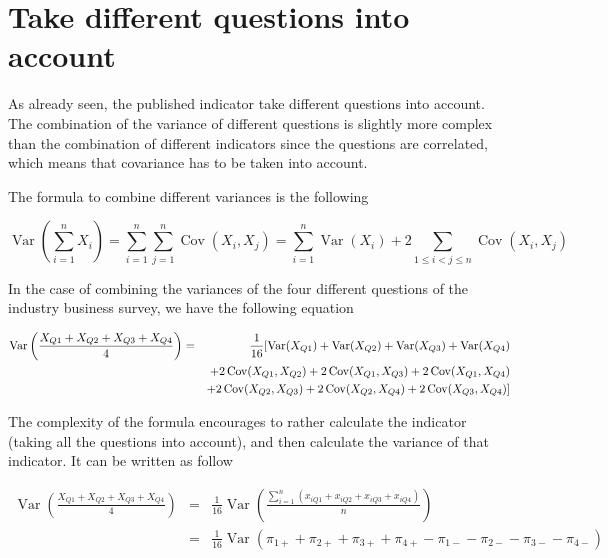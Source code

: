 \documentclass[12pt,a4paper,oneside]{book}
\DeclareMathOperator{\Var}{Var}
\DeclareMathOperator{\Cov}{Cov}
\begin{document}
\section{Take different questions into account}

As already seen, the published indicator take different questions into account. 
The combination of the variance of different questions is slightly more complex than the combination of different indicators since the questions are correlated, which means that covariance has to be taken into account.

The formula to combine different variances is the following

\begin{equation}
\Var \left(\sum_{i=1}^{n} X_{i}\right) = \sum_{i=1}^{n} \sum_{j=1}^{n} \Cov\left(X_{i}, X_{j}\right)
= \sum_{i=1}^{n} \Var\left(X_{i}\right)+2 \sum_{1 \leq i<j \leq n} \Cov\left(X_{i}, X_{j}\right)
\end{equation} 

In the case of combining the variances of the four different questions of the industry business survey, we have the following equation

\begin{eqnarray}
    \Var \left(\frac{X_{Q1} + X_{Q2} + X_{Q3} + X_{Q4}}{4} \right) &=& \frac{1}{16} \large[ \Var(X_{Q1}) + \Var(X_{Q2}) + \Var(X_{Q3}) + \Var(X_{Q4}) \nonumber \\
    && + 2 \Cov (X_{Q1},X_{Q2}) + 2 \Cov (X_{Q1},X_{Q3}) + 2 \Cov (X_{Q1},X_{Q4}) \nonumber \\
    &&  + 2 \Cov (X_{Q2},X_{Q3}) + 2 \Cov (X_{Q2},X_{Q4}) + 2 \Cov (X_{Q3},X_{Q4}) \large] \nonumber \\
\end{eqnarray}

The complexity of the formula encourages to rather calculate the indicator (taking all the questions into account), and then calculate the variance of that indicator. It can be written as follow

\begin{eqnarray}
    \Var \left(\frac{X_{Q1} + X_{Q2} + X_{Q3} + X_{Q4}}{4} \right) 
    &=& \frac{1}{16} \Var \left(\frac{\sum_{i=1}^n \left(x_{i Q1} + x_{i Q2} + x_{i Q3} + x_{i Q4} \right)}{n} \right) \nonumber \\
    &=& \frac{1}{16} \Var \left(\pi_{1+} + \pi_{2+} + \pi_{3+} + \pi_{4+} - \pi_{1-} - \pi_{2-} - \pi_{3-} - \pi_{4-}  \right) \nonumber \\
\end{eqnarray}
\end{document}
